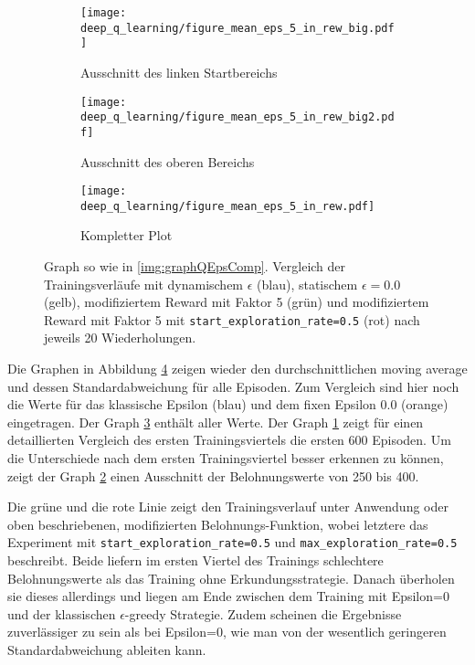 \begin{figure}[h!]
    \centering
    \begin{subfigure}[b]{0.49\textwidth}
        \texttt{[image: deep\_q\_learning/figure\_mean\_eps\_5\_in\_rew\_big.pdf]}
        \caption{Ausschnitt des linken Startbereichs}
        \label{img:graphEps5InRewBig}
    \end{subfigure}
    \begin{subfigure}[b]{0.49\textwidth}
        \texttt{[image: deep\_q\_learning/figure\_mean\_eps\_5\_in\_rew\_big2.pdf]}
        \caption{Ausschnitt des oberen Bereichs}
        \label{img:graphEps5InRewBig2}
    \end{subfigure}
    \begin{subfigure}[b]{0.7\textwidth}
        \texttt{[image: deep\_q\_learning/figure\_mean\_eps\_5\_in\_rew.pdf]}
        \caption{Kompletter Plot}
        \label{img:graphEps5InRew}
    \end{subfigure}
    \caption{Graph so wie in \ref{img:graphQEpsComp}. Vergleich der Trainingsverläufe mit dynamischem $ \epsilon $ (blau), statischem $ \epsilon = 0.0 $ (gelb), modifiziertem Reward mit Faktor 5 (grün) und modifiziertem Reward mit Faktor 5 mit \texttt{start_exploration_rate=0.5} (rot) nach jeweils 20 Wiederholungen.}
    \label{img:graphEps5InRewBoth}
\end{figure} 

Die Graphen in Abbildung \ref{img:graphEps5InRewBoth} zeigen wieder den durchschnittlichen moving average und dessen Standardabweichung für alle Episoden. Zum Vergleich sind hier noch die Werte für das klassische Epsilon (blau) und dem fixen Epsilon 0.0 (orange) eingetragen. Der Graph \ref{img:graphEps5InRew} enthält aller Werte. Der Graph \ref{img:graphEps5InRewBig} zeigt für einen detaillierten Vergleich des ersten Trainingsviertels die ersten 600 Episoden. Um die Unterschiede nach dem ersten Trainingsviertel besser erkennen zu können, zeigt der Graph \ref{img:graphEps5InRewBig2} einen Ausschnitt der Belohnungswerte von 250 bis 400.

Die grüne und die rote Linie zeigt den Trainingsverlauf unter Anwendung oder oben beschriebenen, modifizierten Belohnungs-Funktion, wobei letztere das Experiment mit \texttt{start_exploration_rate=0.5} und \texttt{max_exploration_rate=0.5} beschreibt. Beide liefern im ersten Viertel des Trainings schlechtere Belohnungswerte als das Training ohne Erkundungsstrategie. Danach überholen sie dieses allerdings und liegen am Ende zwischen dem Training mit Epsilon=0 und der klassischen $ \epsilon $-greedy Strategie. Zudem scheinen die Ergebnisse zuverlässiger zu sein als bei Epsilon=0, wie man von der wesentlich geringeren Standardabweichung ableiten kann.

